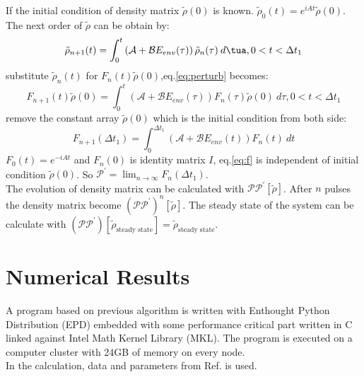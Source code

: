 \documentclass[11pt,a4paper]{article}
\begin{document}
If the initial condition of density matrix $\tilde{\rho}(0)$ is known. $\tilde{\rho}_{0} (t) = e^{i A t} \tilde{\rho}(0)$. The next order of $\tilde{\rho}$ can be obtain by:
\begin{equation}
  \label{eq:perturb}
  \tilde{\rho}_{n+1}(t) = \int_0^{t} \left( \mathcal{A}+\mathcal{B} E_{env}(\tau) \right) \tilde{\rho}_n(\tau)\:d\tua, 0<t<\Delta t_1
\end{equation}
substitute $\tilde{\rho}_n(t)$ for $F_n(t)\tilde{\rho}(0)$,eq.\ref{eq:perturb} becomes:
\begin{equation}
  F_{n+1}(t)\tilde{\rho}(0) = \int_0^{t} \left( \mathcal{A}+\mathcal{B} E_{env}(\tau) \right) F_n(\tau)\tilde{\rho}(0)\:d\tau, 0<t<\Delta t_1
\end{equation}
remove the constant array $\tilde{\rho}(0)$ which is the initial condition from both side:
\begin{equation}
  \label{eq:f}
  F_{n+1}(\Delta t_1) = \int_0^{\Delta t_1} \left( \mathcal{A}+\mathcal{B} E_{env}(t) \right) F_n(t)\:dt
\end{equation}
$F_0(t) = e^{-iAt}$ and $F_{n}(0)$ is identity matrix $I$, eq.\ref{eq:f} is independent of initial condition $\tilde{\rho}(0)$. So $\mathcal{P}^\prime = \lim_{n\rightarrow \infty}F_{n}(\Delta t_{1})$.\\

The evolution of density matrix can be calculated with $\mathcal{P}\mathcal{P}^\prime \left[ \tilde{\rho} \right]$. After $n$ pulses the density matrix become $\left(\mathcal{P} \mathcal{P}^{\prime} \right)^{n} \left[ \tilde{\rho} \right]$. The steady state of the system can be calculate with $\left(\mathcal{P} \mathcal{P}^{\prime} \right)\left[ \tilde{\rho}_{\mbox{steady state}} \right] = \tilde{\rho}_{\mbox{steady state}}$.



\section{Numerical Results}
A program based on previous algorithm is written with Enthought Python Distribution (EPD) \cite{scipy} embedded with some performance critical part written in C linked against Intel Math Kernel Library (MKL). The program is executed on a computer cluster with 24GB of memory on every node.\\

In the calculation, data and parameters from Ref.\cite{Steck2003} is used. \\
\end{document}
